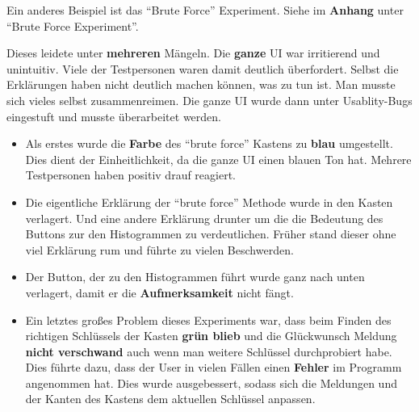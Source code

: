 \documentclass{article}
\begin{document}
\begin{enumerate}
            Ein anderes Beispiel ist das ``Brute Force'' Experiment. Siehe im \textbf{Anhang} unter ``Brute Force Experiment''.\newline
            
            Dieses leidete unter \textbf{mehreren} Mängeln. Die \textbf{ganze} UI war irritierend und unintuitiv.
            Viele der Testpersonen waren damit deutlich überfordert. Selbst die Erklärungen haben nicht deutlich machen können, was zu tun ist. 
            Man musste sich vieles selbst zusammenreimen. Die ganze UI wurde dann unter Usablity-Bugs eingestuft und musste überarbeitet werden.
            \begin{itemize}
             \item Als erstes wurde die \textbf{Farbe} des ``brute force'' Kastens zu \textbf{blau} umgestellt. Dies dient der Einheitlichkeit, da die ganze UI einen blauen 
                   Ton hat. Mehrere Testpersonen haben positiv drauf reagiert.
             
             \item Die eigentliche Erklärung der ``brute force'' Methode wurde in den Kasten verlagert. Und eine andere Erklärung drunter um die die Bedeutung
                   des Buttons zur den Histogrammen zu verdeutlichen. Früher stand dieser ohne viel Erklärung rum und führte zu vielen Beschwerden.
                   
             \item Der Button, der zu den Histogrammen führt wurde ganz nach unten verlagert, damit er die \textbf{Aufmerksamkeit} nicht fängt.
% 
             \item Ein letztes großes Problem dieses Experiments war, dass beim Finden des richtigen Schlüssels der Kasten \textbf{grün blieb} und die Glückwunsch Meldung
                   \textbf{nicht verschwand} auch wenn man weitere Schlüssel durchprobiert habe. Dies führte dazu, dass der User in vielen Fällen einen \textbf{Fehler} im Programm
                   angenommen hat. Dies wurde ausgebessert, sodass sich die Meldungen und der Kanten des Kastens dem aktuellen Schlüssel anpassen.
            \end{itemize}
     \end{enumerate}
\end{document}
